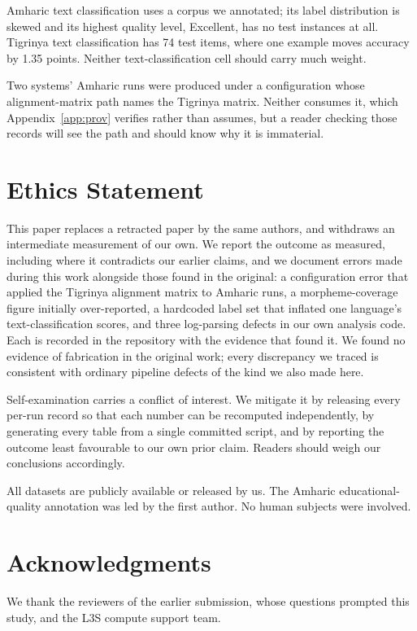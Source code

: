 \documentclass[11pt]{article}
\begin{document}
Amharic text classification uses a corpus we annotated; its label
distribution is skewed and its highest quality level, Excellent, has no test
instances at all. Tigrinya text classification has 74 test items, where one example
moves accuracy by 1.35 points. Neither text-classification cell should carry
much weight.

Two systems' Amharic runs were produced under a configuration whose
alignment-matrix path names the Tigrinya matrix. Neither consumes it, which
Appendix~\ref{app:prov} verifies rather than assumes, but a reader checking
those records will see the path and should know why it is immaterial.

\section*{Ethics Statement}

This paper replaces a retracted paper by the same authors, and withdraws an
intermediate measurement of our own. We report the outcome as measured,
including where it contradicts our earlier claims, and we document errors
made during this work alongside those found in the original: a configuration
error that applied the Tigrinya alignment matrix to Amharic runs, a
morpheme-coverage figure initially over-reported, a hardcoded label set that
inflated one language's text-classification scores, and three log-parsing
defects in our own analysis code. Each is recorded in the repository with the
evidence that found it. We found no evidence of fabrication in the original
work; every discrepancy we traced is consistent with ordinary pipeline
defects of the kind we also made here.

Self-examination carries a conflict of interest. We mitigate it by releasing
every per-run record so that each number can be recomputed independently, by
generating every table from a single committed script, and by reporting the
outcome least favourable to our own prior claim. Readers should weigh our
conclusions accordingly.

All datasets are publicly available or released by us. The Amharic
educational-quality annotation was led by the first author. No human subjects
were involved.

\section*{Acknowledgments}

We thank the reviewers of the earlier submission, whose questions prompted
this study, and the L3S compute support team.
\end{document}
